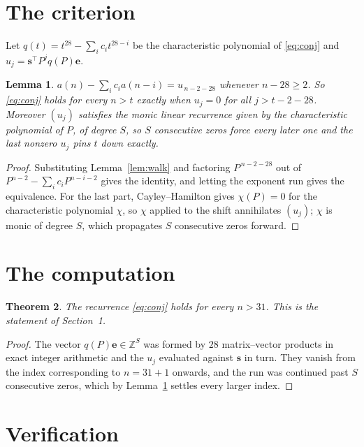 \documentclass[11pt,a4paper]{article}
\theoremstyle{plain}
\newtheorem{theorem}{Theorem}
\newtheorem{lemma}[theorem]{Lemma}
\theoremstyle{definition}
\begin{document}
\section{The criterion}

Let $q(t)=t^{28}-\sum_i c_i t^{28-i}$ be the characteristic polynomial of
\eqref{eq:conj} and $u_j=\mathbf{s}^{\!\top}P^{j}q(P)\mathbf{e}$.

\begin{lemma}\label{lem:crit}
$a(n)-\sum_i c_i a(n-i)=u_{\,n-2-28}$ whenever $n-28\ge2$. So \eqref{eq:conj}
holds for every $n>t$ exactly when $u_j=0$ for all $j>t-2-28$. Moreover $(u_j)$
satisfies the monic linear recurrence given by the characteristic polynomial of $P$, of
degree $S$, so $S$ consecutive zeros force every later one and the last nonzero $u_j$ pins
$t$ down exactly.
\end{lemma}

\begin{proof}
Substituting Lemma~\ref{lem:walk} and factoring $P^{\,n-2-28}$ out of
$P^{n-2}-\sum_i c_i P^{n-i-2}$ gives the identity, and letting the exponent run gives the
equivalence. For the last part, Cayley--Hamilton gives $\chi(P)=0$ for the characteristic
polynomial $\chi$, so $\chi$ applied to the shift annihilates $(u_j)$; $\chi$ is monic of
degree $S$, which propagates $S$ consecutive zeros forward.
\end{proof}

\section{The computation}

\begin{theorem}
The recurrence \eqref{eq:conj} holds for every $n>31$. This is the statement of
Section~1.
\end{theorem}

\begin{proof}
The vector $q(P)\mathbf{e}\in\mathbb{Z}^{S}$ was formed by $28$ matrix--vector
products in exact integer arithmetic and the $u_j$ evaluated against $\mathbf{s}$ in turn.
They vanish from the index corresponding to $n=31+1$ onwards, and the run was continued
past $S$ consecutive zeros, which by Lemma~\ref{lem:crit} settles every larger index.
\end{proof}

\section{Verification}
\end{document}

